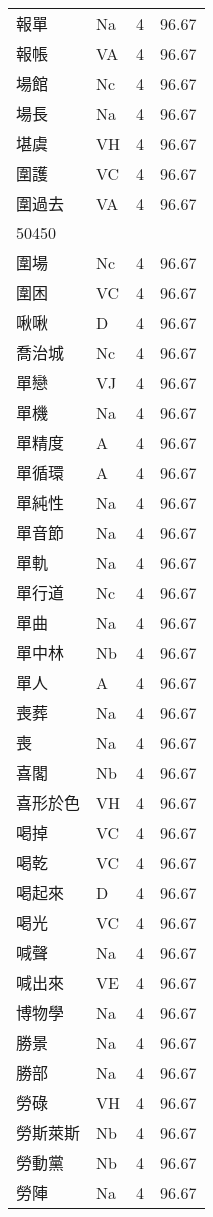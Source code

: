 \documentclass[twocolumn]{book}
\begin{document}
\begin{supertabular}{llrr}
報單 & Na & 4 &  96.67\\
報帳 & VA & 4 &  96.67\\
場館 & Nc & 4 &  96.67\\
場長 & Na & 4 &  96.67\\
堪虞 & VH & 4 &  96.67\\
圍護 & VC & 4 &  96.67\\
圍過去 & VA & 4 &  96.67\\
50450\\
圍場 & Nc & 4 &  96.67\\
圍困 & VC & 4 &  96.67\\
啾啾 & D & 4 &  96.67\\
喬治城 & Nc & 4 &  96.67\\
單戀 & VJ & 4 &  96.67\\
單機 & Na & 4 &  96.67\\
單精度 & A & 4 &  96.67\\
單循環 & A & 4 &  96.67\\
單純性 & Na & 4 &  96.67\\
單音節 & Na & 4 &  96.67\\
單軌 & Na & 4 &  96.67\\
單行道 & Nc & 4 &  96.67\\
單曲 & Na & 4 &  96.67\\
單中林 & Nb & 4 &  96.67\\
單人 & A & 4 &  96.67\\
喪葬 & Na & 4 &  96.67\\
喪 & Na & 4 &  96.67\\
喜閣 & Nb & 4 &  96.67\\
喜形於色 & VH & 4 &  96.67\\
喝掉 & VC & 4 &  96.67\\
喝乾 & VC & 4 &  96.67\\
喝起來 & D & 4 &  96.67\\
喝光 & VC & 4 &  96.67\\
喊聲 & Na & 4 &  96.67\\
喊出來 & VE & 4 &  96.67\\
博物學 & Na & 4 &  96.67\\
勝景 & Na & 4 &  96.67\\
勝部 & Na & 4 &  96.67\\
勞碌 & VH & 4 &  96.67\\
勞斯萊斯 & Nb & 4 &  96.67\\
勞動黨 & Nb & 4 &  96.67\\
勞陣 & Na & 4 &  96.67\\

\end{supertabular}
\end{document}

